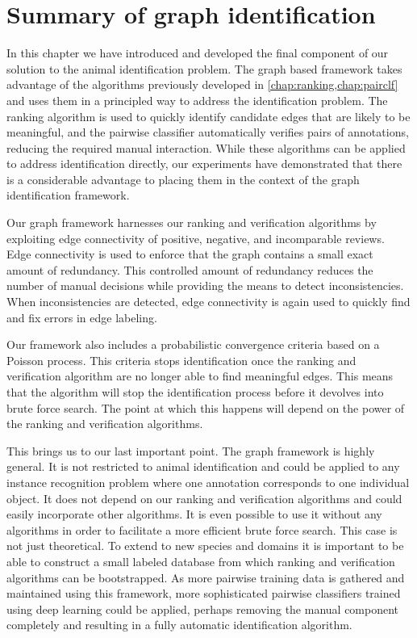  
\FloatBarrier{}
\section{Summary of graph identification}\label{sec:graphconclusion}

In this chapter we have introduced and developed the final component of our solution to the animal identification
  problem.
The graph based framework takes advantage of the algorithms previously developed in
  \cref{chap:ranking,chap:pairclf} and uses them in a principled way to address the identification problem.
The ranking algorithm is used to quickly identify candidate edges that are likely to be meaningful, and the
  pairwise classifier automatically verifies pairs of annotations, reducing the required manual interaction.
While these algorithms can be applied to address identification directly, our experiments have demonstrated that
  there is a considerable advantage to placing them in the context of the graph identification framework.

Our graph framework harnesses our ranking and verification algorithms by exploiting edge connectivity of
  positive, negative, and incomparable reviews.
Edge connectivity is used to enforce that the graph contains a small exact amount of redundancy.
This controlled amount of redundancy reduces the number of manual decisions while providing the means to detect
  inconsistencies.
When inconsistencies are detected, edge connectivity is again used to quickly find and fix errors in edge
  labeling.

Our framework also includes a probabilistic convergence criteria based on a Poisson process.
This criteria stops identification once the ranking and verification algorithm are no longer able to find
  meaningful edges.
This means that the algorithm will stop the identification process before it devolves into brute force search.
The point at which this happens will depend on the power of the ranking and verification algorithms.

This brings us to our last important point.
The graph framework is highly general.
It is not restricted to animal identification and could be applied to any instance recognition problem where one
  annotation corresponds to one individual object.
It does not depend on our ranking and verification algorithms and could easily incorporate other algorithms.
It is even possible to use it without any algorithms in order to facilitate a more efficient brute force search.
This case is not just theoretical.
To extend to new species and domains it is important to be able to construct a small labeled database from which
  ranking and verification algorithms can be bootstrapped.
As more pairwise training data is gathered and maintained using this framework, more sophisticated pairwise
  classifiers trained using deep learning could be applied, perhaps removing the manual component completely and
  resulting in a fully automatic identification algorithm.

